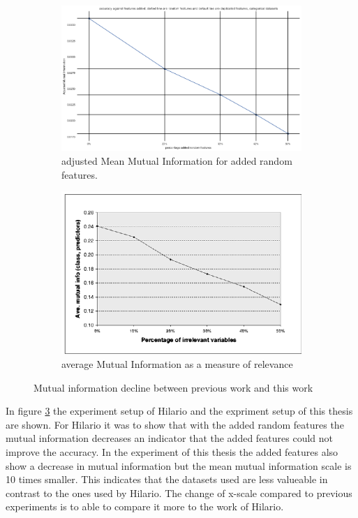 \documentclass[a4paper,10pt]{article}
\begin{document}
\begin{figure}[H]
	\centering
	\begin{subfigure}[b]{0.45\textwidth}
		\includegraphics[width=\textwidth]{images/MutualInformationDecay.png}
		\caption{adjusted Mean Mutual Information for added random features.}
		\label{fig:AMMIdecay}
	\end{subfigure}
	\begin{subfigure}[b]{0.45\textwidth}
		\includegraphics[width=\textwidth]{images/MutualInformationDecay-paper.png}
		\caption{average Mutual Information as a measure of relevance}
		\label{fig:AMMIpaper}
	\end{subfigure}
	\caption{Mutual information decline between previous work and this work}\label{fig:MMIs}
	\label{paper-thesis}
\end{figure}

In figure \ref{paper-thesis} the experiment setup of Hilario and the expriment setup of this thesis are shown\cite{Resil-1}. For Hilario it was to show that with the added random features the mutual information decreases an indicator that the added features could not improve the accuracy. In the experiment of this thesis the added features also show a decrease in mutual information but the mean mutual information scale is 10 times smaller. This indicates that the datasets used are less valueable in contrast to the ones used by Hilario. The change of x-scale compared to previous experiments is to able to compare it more to the work of Hilario.
\end{document}
